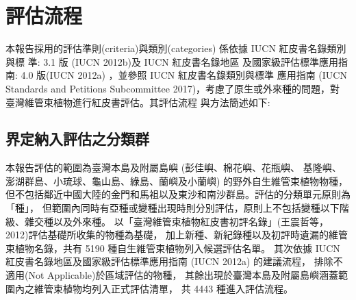 \chapter{評估流程}
\begin{multicols}{2}

本報告採用的評估準則(criteria)與類別(categories) 係依據 IUCN 紅皮書名錄類別與標 準: 3.1 版 (IUCN 2012b)及 IUCN 紅皮書名錄地區 及國家級評估標準應用指南: 4.0 版(IUCN 2012a) ，並參照 IUCN 紅皮書名錄類別與標準 應用指南 (IUCN Standards and Petitions Subcommittee 2017)，考慮了原生或外來種的問題，對 臺灣維管束植物進行紅皮書評估。其評估流程 與方法簡述如下:
\end{multicols}
\section{界定納入評估之分類群}
\begin{multicols}{2}
本報告評估的範圍為臺灣本島及附屬島嶼 (彭佳嶼、棉花嶼、花瓶嶼、
基隆嶼、澎湖群島、小琉球、龜山島、綠島、蘭嶼及小蘭嶼) 的野外自生維管束植物物種，
但不包括鄰近中國大陸的金門和馬祖以及東沙和南沙群島。評估的分類單元原則為「種」，
但範圍內同時有亞種或變種出現時則分別評估，原則上不包括變種以下階級、雜交種以及外來種。
以「臺灣維管束植物紅皮書初評名錄」(王震哲等，2012)評估基礎所收集的物種為基礎，
加上新種、新紀錄種以及初評時遺漏的維管束植物名錄，共有 5190 種自生維管束植物列入候選評估名單。
其次依據 IUCN 紅皮書名錄地區及國家級評估標準應用指南 (IUCN 2012a) 的建議流程，
排除不適用(Not Applicable)於區域評估的物種，
其餘出現於臺灣本島及附屬島嶼涵蓋範圍內之維管束植物均列入正式評估清單，
共 4443 種進入評估流程。
\end{multicols}

